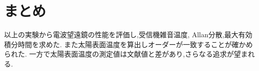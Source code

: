 \section{まとめ}
以上の実験から電波望遠鏡の性能を評価し,受信機雑音温度, Allan分散,最大有効積分時間を求めた.
また太陽表面温度を算出しオーダーが一致することが確かめられた.
一方で太陽表面温度の測定値は文献値と差があり,さらなる追求が望まれる.